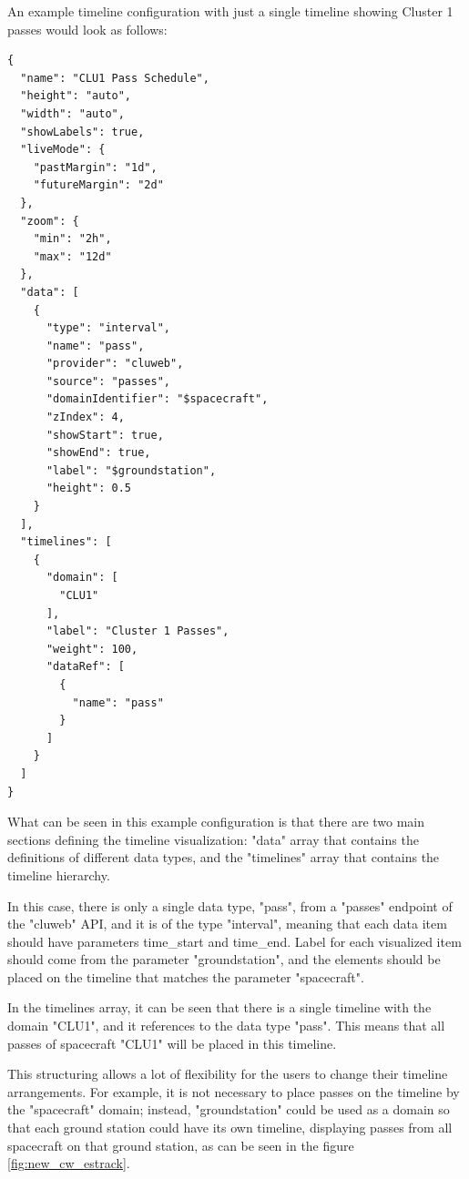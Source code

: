 An example timeline configuration with just a single timeline showing Cluster 1 passes would look as follows:

\begin{verbatim}
{
  "name": "CLU1 Pass Schedule",
  "height": "auto",
  "width": "auto",
  "showLabels": true,
  "liveMode": {
    "pastMargin": "1d",
    "futureMargin": "2d"
  },
  "zoom": {
    "min": "2h",
    "max": "12d"
  },
  "data": [
    {
      "type": "interval",
      "name": "pass",
      "provider": "cluweb",
      "source": "passes",
      "domainIdentifier": "$spacecraft",
      "zIndex": 4,
      "showStart": true,
      "showEnd": true,
      "label": "$groundstation",
      "height": 0.5
    }
  ],
  "timelines": [
    {
      "domain": [
        "CLU1"
      ],
      "label": "Cluster 1 Passes",
      "weight": 100,
      "dataRef": [
        {
          "name": "pass"
        }
      ]
    }
  ]
}
\end{verbatim}

What can be seen in this example configuration is that there are two main sections defining the timeline visualization: "data" array that contains the definitions of different data types, and the "timelines" array that contains the timeline hierarchy.

In this case, there is only a single data type, "pass", from a "passes" endpoint of the "cluweb" API, and it is of the type "interval", meaning that each data item should have parameters time\_start and time\_end. Label for each visualized item should come from the parameter "groundstation", and the elements should be placed on the timeline that matches the parameter "spacecraft".

In the timelines array, it can be seen that there is a single timeline with the domain "CLU1", and it references to the data type "pass". This means that all passes of spacecraft "CLU1" will be placed in this timeline.

This structuring allows a lot of flexibility for the users to change their timeline arrangements. For example, it is not necessary to place passes on the timeline by the "spacecraft" domain; instead, "groundstation" could be used as a domain so that each ground station could have its own timeline, displaying passes from all spacecraft on that ground station, as can be seen in the figure \ref{fig:new_cw_estrack}.


